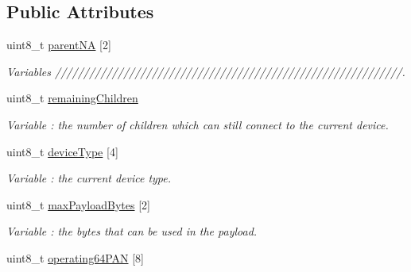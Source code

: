 \subsection*{Public Attributes}
\begin{DoxyCompactItemize}
\item 
uint8\+\_\+t \hyperlink{class_wasp_x_bee_z_b_aae3447c38de3275ca8ff2fbd67d982e9}{parent\+NA} \mbox{[}2\mbox{]}
\begin{DoxyCompactList}\small\item\em Variables /////////////////////////////////////////////////////////////. \end{DoxyCompactList}\item 
uint8\+\_\+t \hyperlink{class_wasp_x_bee_z_b_a0eaef957b4be07d9827c0bc51d3d8cc4}{remaining\+Children}\hypertarget{class_wasp_x_bee_z_b_a0eaef957b4be07d9827c0bc51d3d8cc4}{}\label{class_wasp_x_bee_z_b_a0eaef957b4be07d9827c0bc51d3d8cc4}

\begin{DoxyCompactList}\small\item\em Variable \+: the number of children which can still connect to the current device. \end{DoxyCompactList}\item 
uint8\+\_\+t \hyperlink{class_wasp_x_bee_z_b_a731285d51e4cdf41a2f49118f67c6099}{device\+Type} \mbox{[}4\mbox{]}\hypertarget{class_wasp_x_bee_z_b_a731285d51e4cdf41a2f49118f67c6099}{}\label{class_wasp_x_bee_z_b_a731285d51e4cdf41a2f49118f67c6099}

\begin{DoxyCompactList}\small\item\em Variable \+: the current device type. \end{DoxyCompactList}\item 
uint8\+\_\+t \hyperlink{class_wasp_x_bee_z_b_a09e59c0f17b3a353ef02ad4f4569d0fc}{max\+Payload\+Bytes} \mbox{[}2\mbox{]}\hypertarget{class_wasp_x_bee_z_b_a09e59c0f17b3a353ef02ad4f4569d0fc}{}\label{class_wasp_x_bee_z_b_a09e59c0f17b3a353ef02ad4f4569d0fc}

\begin{DoxyCompactList}\small\item\em Variable \+: the bytes that can be used in the payload. \end{DoxyCompactList}\item 
uint8\+\_\+t \hyperlink{class_wasp_x_bee_z_b_ad1643e0a2c44373a303ce438d5f540bf}{operating64\+P\+AN} \mbox{[}8\mbox{]}\hypertarget{class_wasp_x_bee_z_b_ad1643e0a2c44373a303ce438d5f540bf}{}\label{class_wasp_x_bee_z_b_ad1643e0a2c44373a303ce438d5f540bf}


\end{DoxyCompactItemize}
